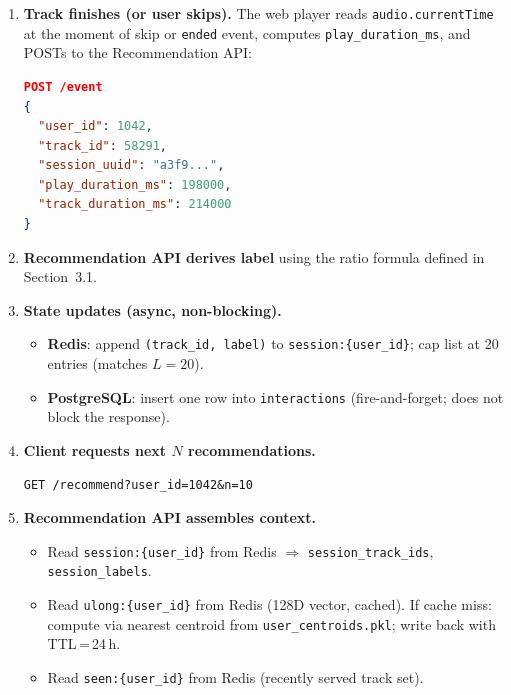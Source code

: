 \documentclass[11pt]{article}
\begin{document}
\begin{enumerate}[leftmargin=1.5em]

  \item \textbf{Track finishes (or user skips).}
        The web player reads \texttt{audio.currentTime} at the moment of skip or
        \texttt{ended} event, computes \texttt{play\_duration\_ms}, and POSTs to the
        Recommendation API:
\begin{lstlisting}[language=json]
POST /event
{
  "user_id": 1042,
  "track_id": 58291,
  "session_uuid": "a3f9...",
  "play_duration_ms": 198000,
  "track_duration_ms": 214000
}
\end{lstlisting}

  \item \textbf{Recommendation API derives label} using the ratio formula defined in
        Section~3.1.

  \item \textbf{State updates (async, non-blocking).}
        \begin{itemize}
          \item \textbf{Redis}: append \texttt{(track\_id, label)} to
                \texttt{session:\{user\_id\}}; cap list at 20 entries (matches $L=20$).
          \item \textbf{PostgreSQL}: insert one row into \texttt{interactions}
                (fire-and-forget; does not block the response).
        \end{itemize}

  \item \textbf{Client requests next $N$ recommendations.}
\begin{lstlisting}
GET /recommend?user_id=1042&n=10
\end{lstlisting}

  \item \textbf{Recommendation API assembles context.}
        \begin{itemize}
          \item Read \texttt{session:\{user\_id\}} from Redis
                $\Rightarrow$ \texttt{session\_track\_ids}, \texttt{session\_labels}.
          \item Read \texttt{ulong:\{user\_id\}} from Redis (128D vector, cached).
                If cache miss: compute via nearest centroid from
                \texttt{user\_centroids.pkl}; write back with TTL\,=\,24\,h.
          \item Read \texttt{seen:\{user\_id\}} from Redis (recently served track set).
        \end{itemize}


\end{enumerate}
\end{document}

